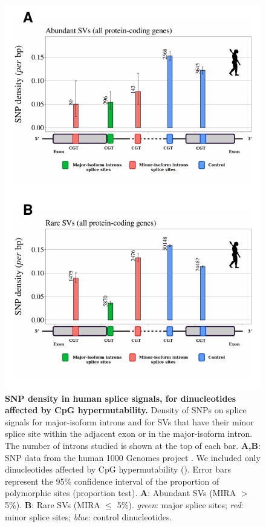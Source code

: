 \begin{figure}[t]   
    \begin{center}                                                                       
        \includegraphics {Figure6_supp.pdf}
    \end{center}
    \caption[SNP density in human splice signals, for dinucleotides affected by CpG hypermutability]{\textbf{SNP density in human splice signals, for dinucleotides affected by CpG hypermutability.} Density of SNPs on splice signals for major-isoform introns and for SVs that have their  minor splice site within the adjacent exon or in the major-isoform intron. The number of introns studied is shown at the top of each bar. \textbf{A,B}: SNP data from the human 1000 Genomes project \citep{auton_global_2015}. We included only dinucleotides affected by CpG hypermutability (). Error bars represent the 95\% confidence interval of the proportion of polymorphic sites (proportion test). \textbf{A}: Abundant SVs (MIRA $>$ 5\%). \textbf{B}: Rare SVs (MIRA $\leq$ 5\%). \textit{green}: major splice sites; \textit{red}: minor splice sites; \textit{blue}: control dinucleotides.
    }
    \label{supp_fig:AS6}
\end{figure}

